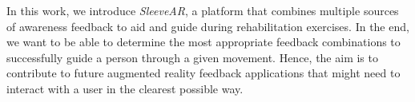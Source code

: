 In this work, we introduce {\it SleeveAR}, a platform that combines multiple sources of awareness feedback to aid and guide during rehabilitation exercises.  
In the end, we want to be able to determine the most appropriate feedback combinations to successfully guide a person through a given movement.
Hence, the aim is to contribute to future augmented reality feedback applications that might need to interact with a user in the clearest possible way.


